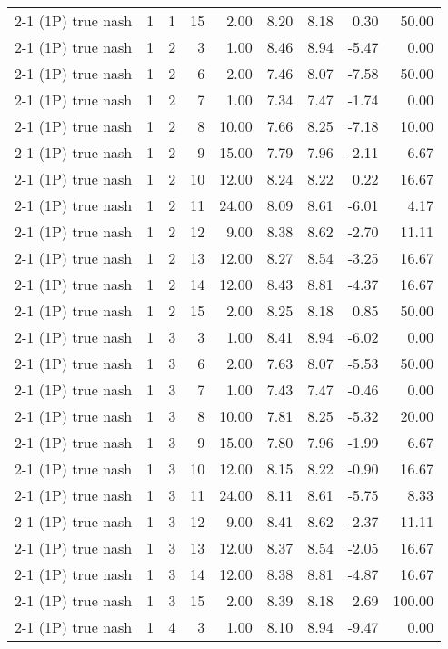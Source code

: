 \begin{tabular}{lrrrrrrrr}
2-1 (1P) true nash & 1 & 1 & 15 & 2.00 & 8.20 & 8.18 & 0.30 & 50.00 \\
2-1 (1P) true nash & 1 & 2 & 3 & 1.00 & 8.46 & 8.94 & -5.47 & 0.00 \\
2-1 (1P) true nash & 1 & 2 & 6 & 2.00 & 7.46 & 8.07 & -7.58 & 50.00 \\
2-1 (1P) true nash & 1 & 2 & 7 & 1.00 & 7.34 & 7.47 & -1.74 & 0.00 \\
2-1 (1P) true nash & 1 & 2 & 8 & 10.00 & 7.66 & 8.25 & -7.18 & 10.00 \\
2-1 (1P) true nash & 1 & 2 & 9 & 15.00 & 7.79 & 7.96 & -2.11 & 6.67 \\
2-1 (1P) true nash & 1 & 2 & 10 & 12.00 & 8.24 & 8.22 & 0.22 & 16.67 \\
2-1 (1P) true nash & 1 & 2 & 11 & 24.00 & 8.09 & 8.61 & -6.01 & 4.17 \\
2-1 (1P) true nash & 1 & 2 & 12 & 9.00 & 8.38 & 8.62 & -2.70 & 11.11 \\
2-1 (1P) true nash & 1 & 2 & 13 & 12.00 & 8.27 & 8.54 & -3.25 & 16.67 \\
2-1 (1P) true nash & 1 & 2 & 14 & 12.00 & 8.43 & 8.81 & -4.37 & 16.67 \\
2-1 (1P) true nash & 1 & 2 & 15 & 2.00 & 8.25 & 8.18 & 0.85 & 50.00 \\
2-1 (1P) true nash & 1 & 3 & 3 & 1.00 & 8.41 & 8.94 & -6.02 & 0.00 \\
2-1 (1P) true nash & 1 & 3 & 6 & 2.00 & 7.63 & 8.07 & -5.53 & 50.00 \\
2-1 (1P) true nash & 1 & 3 & 7 & 1.00 & 7.43 & 7.47 & -0.46 & 0.00 \\
2-1 (1P) true nash & 1 & 3 & 8 & 10.00 & 7.81 & 8.25 & -5.32 & 20.00 \\
2-1 (1P) true nash & 1 & 3 & 9 & 15.00 & 7.80 & 7.96 & -1.99 & 6.67 \\
2-1 (1P) true nash & 1 & 3 & 10 & 12.00 & 8.15 & 8.22 & -0.90 & 16.67 \\
2-1 (1P) true nash & 1 & 3 & 11 & 24.00 & 8.11 & 8.61 & -5.75 & 8.33 \\
2-1 (1P) true nash & 1 & 3 & 12 & 9.00 & 8.41 & 8.62 & -2.37 & 11.11 \\
2-1 (1P) true nash & 1 & 3 & 13 & 12.00 & 8.37 & 8.54 & -2.05 & 16.67 \\
2-1 (1P) true nash & 1 & 3 & 14 & 12.00 & 8.38 & 8.81 & -4.87 & 16.67 \\
2-1 (1P) true nash & 1 & 3 & 15 & 2.00 & 8.39 & 8.18 & 2.69 & 100.00 \\
2-1 (1P) true nash & 1 & 4 & 3 & 1.00 & 8.10 & 8.94 & -9.47 & 0.00 \\

\end{tabular}

